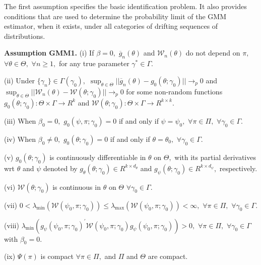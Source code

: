 \documentclass[12pt,thmsb,titlepage,final,oneside,letterpaper]{article}
\begin{document}
\hspace{0.25in}The first assumption specifies the basic identification
problem. It also provides conditions that are used to determine the
probability limit of the GMM estimator, when it exists, under all categories
of drifting sequences of distributions.\medskip

\noindent \textbf{Assumption GMM1. }(i) If $\beta =0,$ $\overline{g}%
_{n}(\theta )$ and $\mathcal{W}_{n}(\theta )$ do not depend on $\pi ,$ $%
\forall \theta \in \Theta ,$ $\forall n\geq 1,$ for any true parameter $%
\gamma ^{\ast }\in \Gamma .$

\noindent (ii) Under $\{\gamma _{n}\}\in \Gamma (\gamma _{0}),$ $%
\sup_{\theta \in \Theta }||\overline{g}_{n}(\theta )-g_{0}(\theta ;\gamma
_{0})||\rightarrow _{p}0$ and $\sup_{\theta \in \Theta }||\mathcal{W}%
_{n}(\theta )-\mathcal{W}(\theta ;\gamma _{0})||\allowbreak \rightarrow
_{p}0 $ for some non-random functions $g_{0}(\theta ;\gamma _{0}):\Theta
\times \Gamma \rightarrow R^{k}$ and $\mathcal{W}(\theta ;\gamma
_{0}):\Theta \times \Gamma \rightarrow R^{k\times k}.$

\noindent (iii) When $\beta _{0}=0,$ $g_{0}(\psi ,\pi ;\gamma _{0})=0$ if
and only if $\psi =\psi _{0},$ $\forall \pi \in \Pi ,$ $\forall \gamma
_{0}\in \Gamma .$

\noindent (iv) When $\beta _{0}\neq 0,$ $g_{0}(\theta ;\gamma _{0})=0$ if
and only if $\theta =\theta _{0},$ $\forall \gamma _{0}\in \Gamma .$

\noindent (v) $g_{0}(\theta ;\gamma _{0})$ is continuously differentiable in 
$\theta $ on $\Theta ,$ with its partial derivatives wrt $\theta $ and $\psi 
$ denoted by $g_{\theta }(\theta ;\gamma _{0})\in R^{k\times d_{\theta }}$
and $g_{\psi }(\theta ;\gamma _{0})\in R^{k\times d_{\psi }},$ respectively.

\noindent (vi) $\mathcal{W}(\theta ;\gamma _{0})$ is continuous in $\theta $
on $\Theta $ $\forall \gamma _{0}\in \Gamma .$

\noindent (vii) $0<\lambda _{\min }(\mathcal{W}(\psi _{0},\pi ;\gamma
_{0}))\leq \lambda _{\max }(\mathcal{W}(\psi _{0},\pi ;\gamma _{0}))<\infty
, $ $\forall \pi \in \Pi ,$ $\forall \gamma _{0}\in \Gamma .$

\noindent (viii) $\lambda _{\min }(g_{\psi }(\psi _{0},\pi ;\gamma
_{0})^{\prime }\mathcal{W}(\psi _{0},\pi ;\gamma _{0})g_{\psi }(\psi
_{0},\pi ;\gamma _{0}))>0,$ $\forall \pi \in \Pi ,$ $\forall \gamma _{0}\in
\Gamma $ with $\beta _{0}=0.$

\noindent (ix) $\Psi (\pi )$ is compact $\forall \pi \in \Pi ,$ and $\Pi $
and $\Theta $ are compact.
\end{document}
